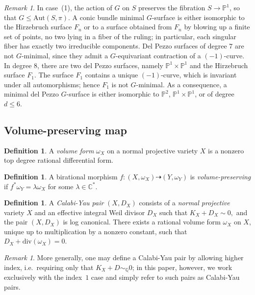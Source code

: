 \documentclass[a4paper,12pt,oneside]{amsart}
\numberwithin{equation}{section}
\theoremstyle{definition}
\newtheorem{definition}[theorem]{Definition}
\theoremstyle{remark}
\newtheorem{remark}[theorem]{Remark}
\newcommand{\Aut}{\mathrm{Aut}}
\begin{document}
\begin{remark}

In case~(1), the action of $G$ on $S$ preserves the fibration $S \to \mathbb P^1$,
so that $G \leqslant \Aut(S,\pi)$. A conic bundle minimal $G$-surface is either isomorphic to the Hirzebruch surface $F_n$ or to a surface obtained
from $F_n$ by blowing up a finite set of points, no two lying in a fiber of the
ruling; in particular, each singular fiber has exactly two irreducible components. Del Pezzo surfaces of degree $7$ are not $G$-minimal, since they admit a $G$-equivariant contraction of a $(-1)$-curve. In degree $8$, there are two del Pezzo surfaces, namely $\mathbb P^1 \times \mathbb P^1$
and the Hirzebruch surface $F_1$.
The surface $F_1$ contains a unique $(-1)$-curve, which is invariant under
all automorphisms; hence $F_1$ is not $G$-minimal. As a consequence, a minimal del Pezzo $G$-surface is either isomorphic to
$\mathbb P^2$, $\mathbb P^1 \times \mathbb P^1$, or of degree $d \le 6$.
\end{remark}


\subsection{Volume-preserving map}
\begin{definition}
A \emph{volume form} $\omega_X$ on a normal projective variety $X$ is a nonzero top degree rational differential form.  
\end{definition}



\begin{definition}
A birational morphism $f: (X,\omega_X) \dashrightarrow (Y,\omega_Y)$ is \emph{volume-preserving} if $f^*\omega_Y = \lambda \omega_X$ for some $\lambda \in \mathbb{C}^*$.

\end{definition}

\begin{definition}
A \emph{Calabi-Yau pair} $(X,D_X)$ consists of a \emph{normal projective} variety $X$
and an effective integral Weil divisor $D_X$ such that
\(
K_X + D_X \sim 0,
\)
and the pair $(X,D_X)$ is log canonical.
There exists a rational volume form $\omega_X$ on $X$, unique up to
multiplication by a nonzero constant, such that
\(
D_X + \mathrm{div}(\omega_X)=0.
\)
\end{definition}

\begin{remark}
More generally, one may define a Calabi-Yau pair by allowing higher index, i.e.\
requiring only that $K_X + D \sim_{\mathbb Q} 0$; in this paper, however, we work
exclusively with the index~$1$ case and simply refer to such pairs as
Calabi-Yau pairs.
\end{remark}
\end{document}
